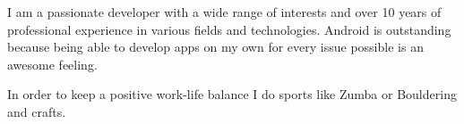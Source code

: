 
\begin{cvparagraph}

I am a passionate developer with a wide range of interests and over 10 years of professional experience in various fields and technologies. Android is outstanding because being able to develop apps on my own for every issue possible is an awesome feeling.

In order to keep a positive work-life balance I do sports like Zumba or Bouldering and crafts.
\end{cvparagraph}

